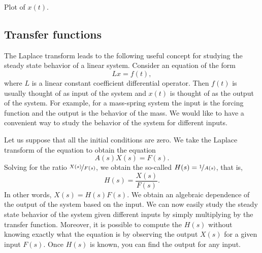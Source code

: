 \begin{example}
\begin{myfig}
\capstart
{}
\caption{Plot of $x(t)$.\label{lt:heavisideexfig}}
\end{myfig}
\end{example}

\subsection{Transfer functions}

The Laplace transform leads to the following useful concept for studying the
steady state behavior of a linear system.  Consider an equation of the
form
\begin{equation*}
L x = f(t) ,
\end{equation*}
where $L$ is a linear constant coefficient differential operator.
Then $f(t)$ is usually thought of as input of the system and $x(t)$ is
thought of as the output of the system.  For example, for a mass-spring
system the input is the forcing function and the output is the behavior of the
mass.  We would like to have a convenient way to study the behavior of
the system for different inputs.

Let us suppose that
all the initial conditions are zero.
We take the Laplace transform of the equation to obtain the equation
\begin{equation*}
A(s) X(s) = F(s) .
\end{equation*}
Solving for the ratio $\nicefrac{X(s)}{F(s)}$, we obtain the so-called
\emph{}
$H(s) = \nicefrac{1}{A(s)}$,
that is,
\begin{equation*}
H(s) = \frac{X(s)}{F(s)} .
\end{equation*}
In other words, $X(s) = H(s) F(s)$.  We obtain an algebraic dependence of
the output of the system based on the input.  We can now easily study the
steady state behavior of the system given different inputs by simply
multiplying by the transfer function.
Moreover, it is possible to compute the $H(s)$ without knowing exactly what
the equation is by observing the output $X(s)$ for a given input $F(s)$.
Once $H(s)$ is known, you can find the output for any input.

